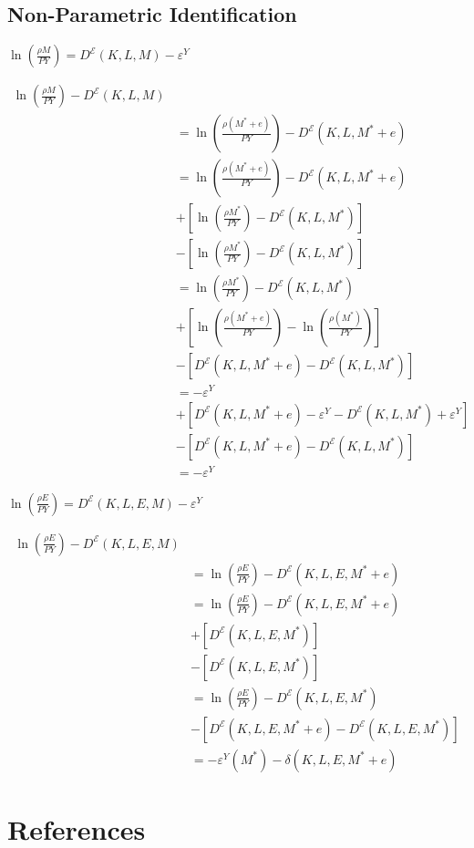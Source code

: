 \documentclass[
  12pt]{article}
\begin{document}
\hypertarget{non-parametric-identification}{%
\subsection{Non-Parametric
Identification}\label{non-parametric-identification}}

\(\ln\left(\frac{\rho M}{PY}\right)=D^{\mathcal{E}}(K,L,M)-\varepsilon^Y\)

\[
\begin{aligned}
\ln\left(\frac{\rho M}{PY}\right)-D^{\mathcal{E}}(K,L,M)& \\
&=\ln\left(\frac{\rho(M^*+e)}{PY}\right)-D^{\mathcal{E}}(K,L,M^*+e)\\
&=\ln\left(\frac{\rho(M^*+e)}{PY}\right)-D^{\mathcal{E}}(K,L,M^*+e)\\
&+\left[\ln\left(\frac{\rho M^*}{PY}\right)-D^{\mathcal{E}}(K,L,M^*)\right]\\
&-\left[\ln\left(\frac{\rho M^*}{PY}\right)-D^{\mathcal{E}}(K,L,M^*)\right] \\
&=\ln\left(\frac{\rho M^*}{PY}\right)-D^{\mathcal{E}}(K,L,M^*) \\
&+\left[\ln\left(\frac{\rho(M^*+e)}{PY}\right)-\ln\left(\frac{\rho(M^*)}{PY}\right)\right]\\
&-\left[D^{\mathcal{E}}(K,L,M^*+e)-D^{\mathcal{E}}(K,L,M^*)\right]\\
&= -\varepsilon^Y \\
&+\left[D^{\mathcal{E}}(K,L,M^*+e)-\varepsilon^Y-D^{\mathcal{E}}(K,L,M^*)+\varepsilon^Y\right]\\
&-\left[D^{\mathcal{E}}(K,L,M^*+e)-D^{\mathcal{E}}(K,L,M^*)\right]\\
&= -\varepsilon^Y
\end{aligned}
\]

\(\ln\left(\frac{\rho E}{PY}\right)=D^{\mathcal{E}}(K,L,E,M)-\varepsilon^Y\)

\[
\begin{aligned}
\ln\left(\frac{\rho E}{PY}\right)-D^{\mathcal{E}}(K,L,E,M)& \\
&=\ln\left(\frac{\rho E}{PY}\right)-D^{\mathcal{E}}(K,L,E,M^*+e)\\
&=\ln\left(\frac{\rho E}{PY}\right)-D^{\mathcal{E}}(K,L,E,M^*+e)\\
&+\left[D^{\mathcal{E}}(K,L,E,M^*)\right]\\
&-\left[D^{\mathcal{E}}(K,L,E,M^*)\right] \\
&=\ln\left(\frac{\rho E}{PY}\right)-D^{\mathcal{E}}(K,L,E,M^*) \\
&-\left[D^{\mathcal{E}}(K,L,E,M^*+e)-D^{\mathcal{E}}(K,L,E,M^*)\right]\\
&= -\varepsilon^Y(M^*) - \delta(K,L,E,M^*+e)
\end{aligned}
\]

\hypertarget{references}{%
\section*{References}\label{references}}

\renewcommand{\bibsection}{}

\end{document}

